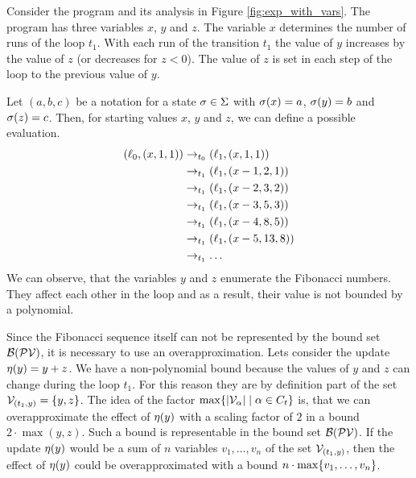 \begin{example}
  
  Consider the program and its analysis in Figure \ref{fig:exp_with_vars}.  
  The program has three variables $x$, $y$ and $z$.
  The variable $x$ determines the number of runs of the loop $t_1$.
  With each run of the transition $t_1$ the value of $y$ increases by the value of $z$ (or decreases for $z < 0$).
  The value of $z$ is set in each step of the loop to the previous value of $y$.
  
  Let $(a,b,c)$ be a notation for a state $\sigma \in \Sigma$ with $\sigma(x) = a$, $\sigma(y) = b$ and $\sigma(z) = c$.
  Then, for starting values $x$, $y$ and $z$, we can define a possible evaluation.
  \begin{align*}
    (\ell_0, (x,1,1)) & \rightarrow_{t_0} (\ell_1, (x,1,1)) \\
    & \rightarrow_{t_1} (\ell_1, (x-1,2,1)) \\
    & \rightarrow_{t_1} (\ell_1, (x-2,3,2)) \\
    & \rightarrow_{t_1} (\ell_1, (x-3,5,3)) \\
    & \rightarrow_{t_1} (\ell_1, (x-4,8,5)) \\
    & \rightarrow_{t_1} (\ell_1, (x-5,13,8)) \\
    & \rightarrow_{t_1} \dots
  \end{align*}
  We can observe, that the variables $y$ and $z$ enumerate the Fibonacci numbers.
  They affect each other in the loop and as a result, their value is not bounded by a polynomial.
  
  Since the Fibonacci sequence itself can not be represented by the bound set $\mathcal{B}(\mathcal{PV})$, it is necessary to use an overapproximation.
  Lets consider the update $\eta(y) = y + z$.
  We have a non-polynomial bound because the values of $y$ and $z$ can change during the loop $t_1$.
  For this reason they are by definition part of the set $\mathcal{V}_{(t_1,y)} = \lbrace y,z \rbrace$.
  The idea of the factor $\max \lbrace \left|\mathcal{V}_\alpha\right| \mid \alpha \in C_t \rbrace$ is, that we can overapproximate the effect of $\eta(y)$ with a scaling factor of $2$ in a bound $2 \cdot \max(y,z)$.
  Such a bound is representable in the bound set $\mathcal{B}(\mathcal{PV})$.
  If the update $\eta(y)$ would be a sum of $n$ variables $v_1, \dots, v_n$ of the set $\mathcal{V}_{(t_1,y)}$, then the effect of $\eta(y)$ could be overapproximated with a bound $n \cdot \max \lbrace v_1, \dots, v_n \rbrace$.
\end{example}


